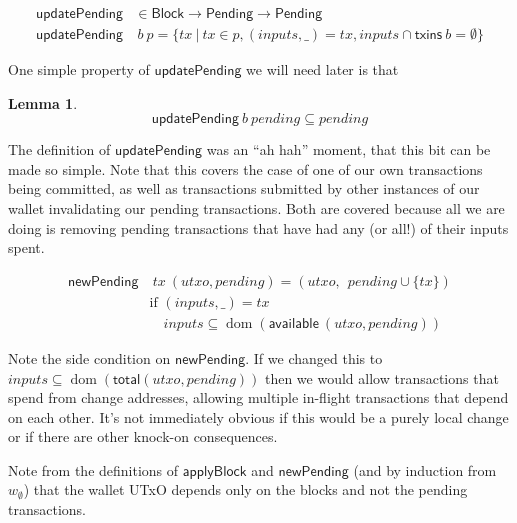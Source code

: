 \documentclass{article}
\DeclareMathOperator{\dom}{dom}
\newtheorem{lemma}{Lemma}
\begin{document}
\begin{equation}
\begin{split}
\mathsf{updatePending} & \in \mathsf{Block} \to \mathsf{Pending} \to \mathsf{Pending} \\
\mathsf{updatePending} & ~ b ~ p = \{ tx ~|~ tx \in p, (inputs, \_) = tx, inputs \cap \mathsf{txins} ~ b = \emptyset \}
\end{split}
\end{equation}

One simple property of $\mathsf{updatePending}$ we will need later is that
%
\begin{lemma} \label{lemma:updatePending_is_filter}
\begin{equation*}
\mathsf{updatePending} ~ b ~ \mathit{pending} \subseteq \mathit{pending}
\end{equation*}
\end{lemma}
%
The definition of $\mathsf{updatePending}$ was an ``ah hah'' moment, that this
bit can be made so simple. Note that this covers the case of one of our own
transactions being committed, as well as transactions submitted by other
instances of our wallet invalidating our pending transactions. Both are covered
because all we are doing is removing pending transactions that have had any (or
all!) of their inputs spent.


\begin{equation}
\begin{split}
\mathsf{newPending} & ~ tx ~ (utxo, pending) = ( utxo, ~~ pending \cup \{ tx \} ) \\
                    & \text{if } (inputs, \_) = tx \\
                    & \quad inputs \subseteq \dom (\mathsf{available} ~ (utxo, pending))
\end{split}
\end{equation}

Note the side condition on $\mathsf{newPending}$. If we changed this to
$inputs \subseteq \dom (\mathsf{total}(utxo, pending))$ then we would allow transactions
that spend from change addresses, allowing multiple in-flight transactions
that depend on each other. It's not immediately obvious if this would be a
purely local change or if there are other knock-on consequences.

Note from the definitions of $\mathsf{applyBlock}$ and $\mathsf{newPending}$
(and by induction from $w_\emptyset$) that the wallet UTxO depends only on the
blocks and not the pending transactions.
\end{document}
